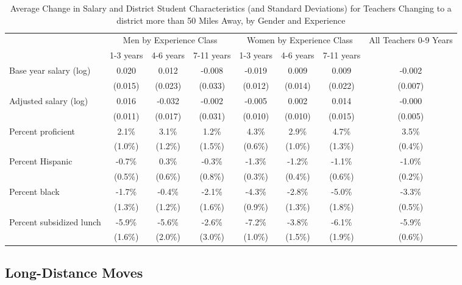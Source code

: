 \begin{sidewaystable}[htbp]
\centering
\begin{tabular}{lccccccc}
  \hline
 & \multicolumn{3}{c}{Men by Experience Class} & \multicolumn{3}{c}{Women by Experience Class} & \multirow{2}{*}{\parbox{0.1\linewidth}{All Teachers 0-9 Years}}\\ \cline{2-4} \cline{5-7}
 & 1-3 years & 4-6 years & 7-11 years & 1-3 years & 4-6 years & 7-11 years &  \\ 
  \hline
Base year salary (log) & 0.020 & 0.012 & -0.008 & -0.019 & 0.009 & 0.009 & -0.002 \\ 
   & (0.015) & (0.023) & (0.033) & (0.012) & (0.014) & (0.022) & (0.007) \\ 
  Adjusted salary (log) & 0.016 & -0.032 & -0.002 & -0.005 & 0.002 & 0.014 & -0.000 \\ 
   & (0.011) & (0.017) & (0.031) & (0.010) & (0.010) & (0.015) & (0.005) \\ 
  Percent proficient & 2.1\% & 3.1\% & 1.2\% & 4.3\% & 2.9\% & 4.7\% & 3.5\% \\ 
   & (1.0\%) & (1.2\%) & (1.5\%) & (0.6\%) & (1.0\%) & (1.3\%) & (0.4\%) \\ 
  Percent Hispanic & -0.7\% & 0.3\% & -0.3\% & -1.3\% & -1.2\% & -1.1\% & -1.0\% \\ 
   & (0.5\%) & (0.6\%) & (0.8\%) & (0.3\%) & (0.4\%) & (0.6\%) & (0.2\%) \\ 
  Percent black & -1.7\% & -0.4\% & -2.1\% & -4.3\% & -2.8\% & -5.0\% & -3.3\% \\ 
   & (1.3\%) & (1.2\%) & (1.6\%) & (0.9\%) & (1.3\%) & (1.8\%) & (0.5\%) \\ 
  Percent subsidized lunch & -5.9\% & -5.6\% & -2.6\% & -7.2\% & -3.8\% & -6.1\% & -5.9\% \\ 
   & (1.6\%) & (2.0\%) & (3.0\%) & (1.0\%) & (1.5\%) & (1.9\%) & (0.6\%) \\ 
   \hline
\end{tabular}
\caption{Average Change in Salary and District Student Characteristics (and Standard Deviations) for Teachers Changing to a district more than 50 Miles Away, by Gender and Experience} 
\label{tbl:change_far_by_ge}
\end{sidewaystable}

\subsection{Long-Distance Moves}\label{long-distance-moves}

